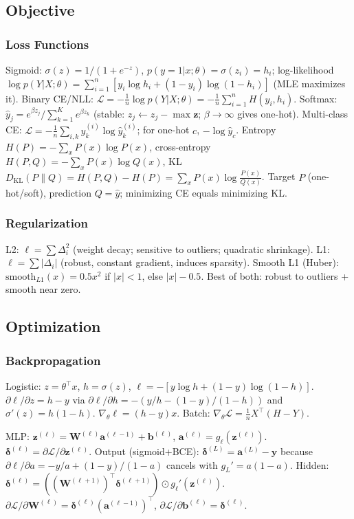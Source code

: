 \subsection{Objective}
\subsubsection*{Loss Functions}
Sigmoid: $\sigma(z)=1/(1+e^{-z})$, $p(y=1|x;\theta)=\sigma(z_i)=h_i$;
log-likelihood $\log p(Y|X;\theta)=\sum_{i=1}^n[y_i\log h_i+(1-y_i)\log(1-h_i)]$ (MLE maximizes it).
Binary CE/NLL: $\mathcal{L}=-\frac{1}{n}\log p(Y|X;\theta)=-\frac{1}{n}\sum_{i=1}^n H(y_i,h_i)$.
Softmax: $\hat{y}_j=e^{\beta z_j}/\sum_{k=1}^K e^{\beta z_k}$ (stable: $z_j\leftarrow z_j-\max\mathbf{z}$; $\beta\to\infty$ gives one-hot).
Multi-class CE: $\mathcal{L}=-\frac{1}{n}\sum_{i,k} y_k^{(i)}\log\hat{y}_k^{(i)}$; for one-hot $c$, $-\log\hat{y}_c$.
Entropy $H(P)=-\sum_x P(x)\log P(x)$, cross-entropy $H(P,Q)=-\sum_x P(x)\log Q(x)$,
KL $D_{\mathrm{KL}}(P\|Q)=H(P,Q)-H(P)=\sum_x P(x)\log\frac{P(x)}{Q(x)}$.
Target $P$ (one-hot/soft), prediction $Q=\hat{y}$; minimizing CE equals minimizing KL.

\subsubsection*{Regularization}
L2: $\ell=\sum\Delta_i^2$ (weight decay; sensitive to outliers; quadratic shrinkage).
L1: $\ell=\sum|\Delta_i|$ (robust, constant gradient, induces sparsity).
Smooth L1 (Huber): $\text{smooth}_{L1}(x)=0.5x^2$ if $|x|<1$, else $|x|-0.5$. Best of both: robust to outliers + smooth near zero.

\subsection{Optimization}
\subsubsection*{Backpropagation}
Logistic: $z=\theta^\top x$, $h=\sigma(z)$, $\ell=-[y\log h+(1-y)\log(1-h)]$.
$\partial\ell/\partial z=h-y$ via $\partial\ell/\partial h=-(y/h-(1-y)/(1-h))$ and $\sigma'(z)=h(1-h)$.
$\nabla_\theta\ell=(h-y)x$. Batch: $\nabla_\theta\mathcal{L}=\frac{1}{n}X^\top(H-Y)$.

MLP: $\mathbf{z}^{(\ell)}=\mathbf{W}^{(\ell)}\mathbf{a}^{(\ell-1)}+\mathbf{b}^{(\ell)}$, $\mathbf{a}^{(\ell)}=g_\ell(\mathbf{z}^{(\ell)})$.
$\boldsymbol{\delta}^{(\ell)}=\partial\mathcal{L}/\partial\mathbf{z}^{(\ell)}$.
Output (sigmoid+BCE): $\boldsymbol{\delta}^{(L)}=\mathbf{a}^{(L)}-\mathbf{y}$ because $\partial\ell/\partial a=-y/a+(1-y)/(1-a)$ cancels with $g_L'=a(1-a)$.
Hidden: $\boldsymbol{\delta}^{(\ell)}=((\mathbf{W}^{(\ell+1)})^\top\boldsymbol{\delta}^{(\ell+1)})\odot g_\ell'(\mathbf{z}^{(\ell)})$.
$\partial\mathcal{L}/\partial\mathbf{W}^{(\ell)}=\boldsymbol{\delta}^{(\ell)}(\mathbf{a}^{(\ell-1)})^\top$, $\partial\mathcal{L}/\partial\mathbf{b}^{(\ell)}=\boldsymbol{\delta}^{(\ell)}$.

